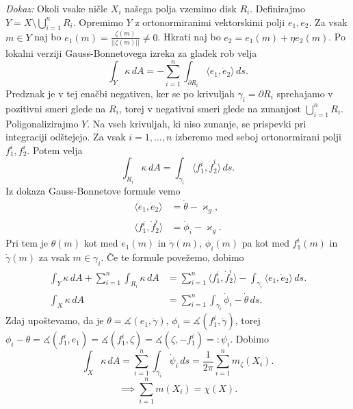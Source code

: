 \noindent
{\em Dokaz:\/}
Okoli vsake ničle $X_i$ našega polja vzemimo disk $R_i$. Definirajmo $Y = X \setminus \bigcup_{i = 1}^{n} R_i$. Opremimo $Y$ z ortonormiranimi vektorskimi polji $e_1, e_2$. Za vsak $m \in Y$ naj bo $e_1(m) = \frac{\zeta(m)}{\lvert\lvert \zeta(m) \rvert\rvert } \neq 0$. Hkrati naj bo
$e_2 = e_1(m) + \eta e_2(m)$. Po lokalni verziji Gauss-Bonnetovega izreka za gladek rob velja \begin{equation*}
\int_{Y} \kappa  \, dA = -\sum_{i = 1}^{n} \int_{\partial R_i} \langle e_1, \dot{e}_2 \rangle   \, ds.  
\end{equation*}
Predznak je v tej enačbi negativen, ker se po krivuljah $\gamma_i = \partial R_i$ sprehajamo v pozitivni smeri glede na $R_i$, torej v negativni smeri glede na zunanjost $\bigcup_{i = 1}^{n} R_i$.    
Poligonalizirajmo $Y$. Na vseh krivuljah, ki niso zunanje, se prispevki pri integraciji odštejejo. Za vsak $i = 1 ,\ldots, n$ izberemo med seboj ortonormirani polji $f_1^{i}, f_2^{i}$. Potem velja \begin{equation*}
\int_{R_i} \kappa   \, dA = \int_{\gamma_i} \langle f_1^{i}, \dot{f}_2^{i} \rangle   \, ds.  
\end{equation*}  
Iz dokaza Gauss-Bonnetove formule vemo \begin{align*}
    \langle e_1, \dot{e}_2  \rangle  &= \dot{\theta} - \varkappa_g, \\
    \langle f_1^{i}, \dot{f}_2^{i}  \rangle  &= \dot{\phi}_i - \varkappa_g. 
\end{align*}
Pri tem je $\theta(m)$ kot med $e_1(m)$ in $\dot{\gamma}(m)$, $\phi_i(m)$ pa kot med $f_1^{i}(m)$ in $\dot{\gamma}(m)$ za vsak $m \in  \gamma_i$. Če te formule povežemo, dobimo \begin{align*}
    \int_{Y} \kappa  \, dA  + \sum_{i = 1}^{n} \int_{R_i} \kappa \, dA  &= \sum_{i = 1}^{n}  \langle f_1^{i}, \dot{f}_2^{i} \rangle - \int_{\gamma_i} \langle e_1, \dot{e}_2 \rangle    \, ds.    \\
    \int_{X} \kappa  \, dA  &= \sum_{i = 1}^{n} \int_{\gamma_i}  \dot{\phi}_i  - \dot{\theta} \, ds.  
\end{align*}
Zdaj upoštevamo, da je $\theta = \measuredangle{(e_1, \dot{\gamma})}$, $\phi_i = \measuredangle{(f_1^{i}, \dot{\gamma})}$, torej $\phi_i - \theta = \measuredangle{(f_1^{i}, e_1)} = \measuredangle{(f_1^{i}, \zeta)} = \measuredangle{(\zeta, -f_1^i)} =: \psi_i$.
Dobimo \begin{equation*}
\int_{X} \kappa  \, dA = \sum_{i = 1}^{n} \int_{\gamma_i} \dot{\psi}_i  \, ds = \frac{1}{2\pi} \sum_{i = 1}^{n} m_\zeta(X_i). 
\end{equation*}
\begin{equation*}
\implies \sum_{i = 1}^{n} m(X_i) = \chi(X).
\end{equation*}  
    
